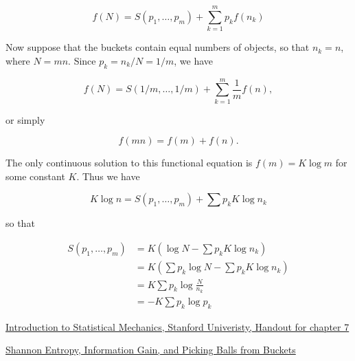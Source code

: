 \begin{equation}
f(N) = S(p_1, \ldots, p_m) + \sum_{k=1}^m p_k f(n_k)
\end{equation}


Now suppose that the buckets contain equal numbers of objects, so that $n_k = n$, where $N = mn$.  Since $p_k = n_k/N = 1/m$, we have

\begin{equation}
f(N) = S(1/m, \ldots, 1/m) + \sum_{k=1}^m \frac{1}{m} f(n),
\end{equation}

or simply


\begin{equation}
f(mn) = f(m) + f(n).
\end{equation}


The only continuous solution to this functional equation is $f(m) = K\log m$
for some constant $K$.  Thus we have

\begin{equation}
K \log n  = S(p_1, \ldots, p_m) + \sum p_k K \log n_k
\end{equation}

so that

\begin{align}
  S(p_1, \ldots, p_m)            & = K(\log N - \sum p_k K \log n_k) \\
             & = K(\sum p_k \log N - \sum p_k K \log n_k) \\
             & = K \sum p_k \log \frac{N}{n_k} \\
             & = - K \sum p_k \log p_k
\end{align}


 \href{http://micro.stanford.edu/~caiwei/me334/Chap7_Entropy_v04.pdf}{Introduction to Statistical Mechanics, Stanford Univeristy, Handout for chapter 7}

\href{https://medium.com/udacity/shannon-entropy-information-gain-and-picking-balls-from-buckets-5810d35d54b4}{Shannon Entropy, Information Gain, and Picking Balls from Buckets}
